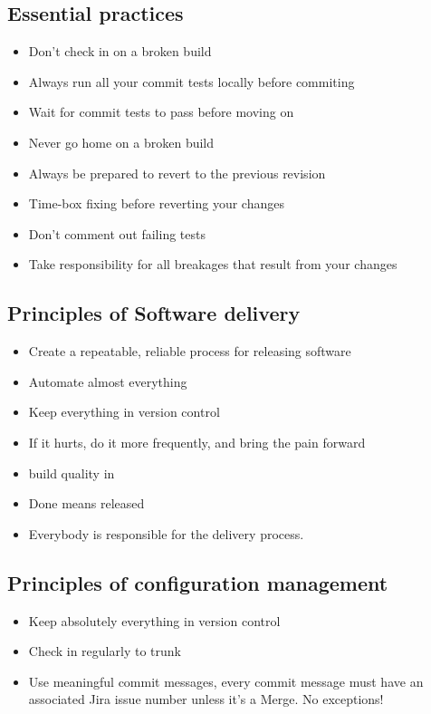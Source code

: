 \documentclass{article}
\begin{document}
\subsection*{Essential practices}
\begin{itemize}
  \item Don't check in on a broken build
  \item Always run all your commit tests locally before commiting
  \item Wait for commit tests to pass before moving on
  \item Never go home on a broken build
  \item Always be prepared to revert to the previous revision
  \item Time-box fixing before reverting your changes
  \item Don't comment out failing tests
  \item Take responsibility for all breakages that result from your
    changes
\end{itemize}

\subsection*{Principles of Software delivery}

\begin{itemize}
  \item Create a repeatable, reliable process for releasing software
  \item Automate almost everything
  \item Keep everything in version control
  \item If it hurts, do it more frequently, and bring the pain forward
  \item build quality in
  \item Done means released
  \item Everybody is responsible for the delivery process.
\end{itemize}

\subsection*{Principles of configuration management}

\begin{itemize}
\item Keep absolutely everything in version control
\item Check in regularly to trunk
\item Use meaningful commit messages, every commit message must have
  an associated Jira issue number unless it's a Merge. No exceptions!
\end{itemize}
\end{document}
